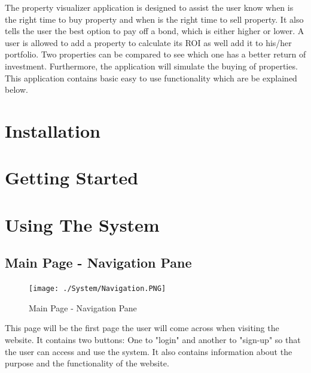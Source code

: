 \documentclass[a4paper,12pt]{article}
\begin{document}
The property visualizer application is designed to assist the user know when is the right time to buy property and when is the right time to sell property. It also tells the user the best option to pay off a bond, which is either higher or lower. A user is allowed to add a property to calculate its ROI as well add it to his/her portfolio. Two properties can be compared to see which one has a better return of investment. Furthermore, the application will simulate the buying of properties. This application contains basic easy to use functionality which are be explained below.
\section{Installation}


\section{Getting Started}

\newpage

\section{Using The System}

 
\subsection{Main Page - Navigation Pane}
	\begin{figure}[H]
		\texttt{[image: ./System/Navigation.PNG]}\\[0.4cm]  
		\caption{Main Page - Navigation Pane}
	\end{figure}
This page will be the first page the user will come across when visiting the website. It contains two buttons: One to "login" and another to "sign-up" so that the user can access and use the system. It also contains information about the purpose and the functionality of the website.

\end{document}

